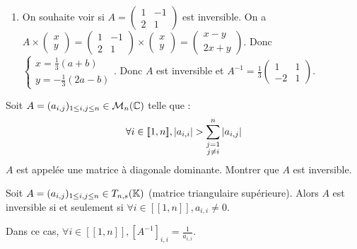 \documentclass[12pt, a4paper]{report}
\begin{document}
\begin{example}
    \begin{enumerate}
        \item On souhaite voir si $A = \left(\begin{matrix} 1 & -1 \\ 2 & 1 \end{matrix}\right)$ est inversible.
        On a $A\times\left(\begin{matrix} x \\ y \end{matrix}\right) = \left(\begin{matrix} 1 & -1 \\ 2 & 1 \end{matrix}\right) \times \left(\begin{matrix} x \\ y \end{matrix}\right) = \left(\begin{matrix} x - y \\ 2x + y \end{matrix}\right)$.
        Donc $\begin{cases} x = \frac13 (a+b) \\ y = -\frac13(2a-b) \end{cases}$. Donc $A$ est inversible et $A^{-1} = \frac13 \left(\begin{matrix} 1 & 1 \\ -2 & 1 \end{matrix}\right)$.
    \end{enumerate}
\end{example}

\begin{exercise}
    Soit $A = (a_{i,j})_{1 \le i,j \le n} \in \mathcal M_n(\mathbb{C})$ telle que :
    $$\forall i \in [\![1,n]\!], \left|a_{i,i}\right| > \sum_{\substack{j=1 \\ j \ne i}}^n \left|a_{i,j}\right|$$
    $A$ est appelée une matrice à diagonale dominante. Montrer que $A$ est inversible.
\end{exercise}

\begin{property}
    Soit $A = (a_{i,j})_{1 \le i,j \le n} \in T_{n,s}(\mathbb{K})$ (matrice triangulaire supérieure). Alors $A$ est inversible si et seulement si $\forall i \in [\![1,n]\!], a_{i,i} \ne 0$.

    Dans ce cas, $\forall i \in [\![1,n]\!], [A^{-1}]_{i,i} = \frac{1}{a_{i,i}}$.
\end{property}
\end{document}
